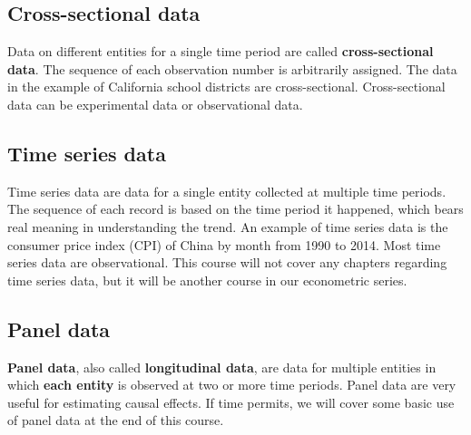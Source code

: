 \documentclass[a4paper,11pt]{article}
\begin{document}
\subsection*{Cross-sectional data}
\label{sec:org945adc4}

Data on different entities for a single time period are called
\textbf{cross-sectional data}. The sequence of each observation number is
arbitrarily assigned. The data in the example of California school
districts are cross-sectional. Cross-sectional data can be
experimental data or observational data. 


\subsection*{Time series data}
\label{sec:org25af7c1}

Time series data are data for a single entity collected at multiple
time periods. The sequence of each record is based on the time period
it happened, which bears real meaning in understanding the trend. An
example of time series data is the consumer price index (CPI) of China
by month from 1990 to 2014. Most time series data are
observational. This course will not cover any chapters regarding time
series data, but it will be another course in our econometric series. 


\subsection*{Panel data}
\label{sec:org303e37f}

\textbf{Panel data}, also called \textbf{longitudinal data}, are data for multiple
entities in which \textbf{each entity} is observed at two or more time
periods. Panel data are very useful for estimating causal effects. If
time permits, we will cover some basic use of panel data at the end of
this course. 
\end{document}
